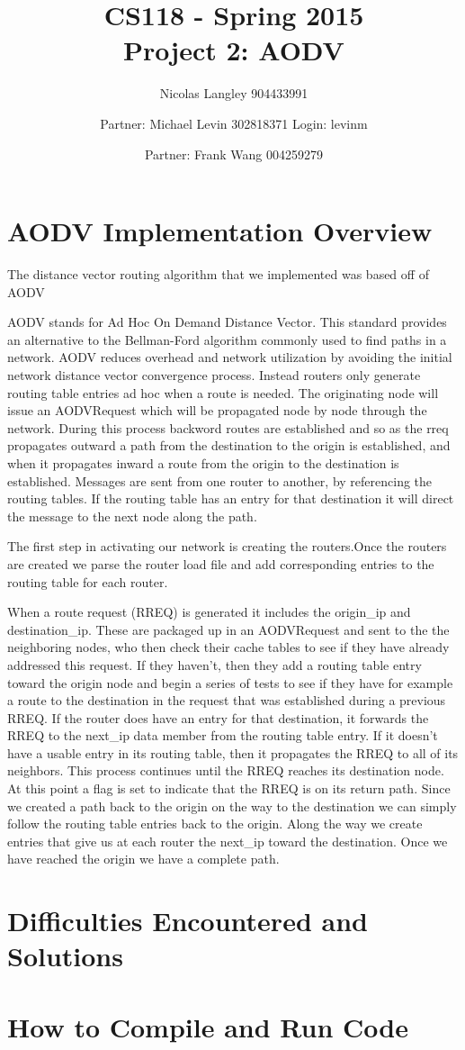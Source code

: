 \documentclass[12pt, titlepage]{article}
\begin{document}
\title{CS118 - Spring 2015 \\
Project 2: AODV}
\author{Nicolas Langley 904433991 \and Partner: Michael Levin 302818371 Login: levinm \and Partner: Frank Wang 004259279}

\maketitle
\section{AODV Implementation Overview}

The distance vector routing algorithm that we implemented was based off of AODV

AODV stands for Ad Hoc On Demand Distance Vector.
This standard provides an alternative to the Bellman-Ford algorithm commonly used to find paths in a network.
AODV reduces overhead and network utilization by avoiding the initial network distance vector convergence process.
Instead routers only generate routing table entries ad hoc when a route is needed.  The originating node will issue an AODVRequest which will be propagated node by node through the network. During this process backword routes are established and so as the rreq propagates outward a path from the destination to the origin is established, and when it propagates inward a route from the origin to the destination is established.  Messages are sent from one router to another, by referencing the routing tables.  If the routing table has an entry for that destination it will direct the message to the next node along the path.

The first step in activating our network is creating the routers.Once the routers are created we parse the router load file and add corresponding entries to the routing table for each router.


When a route request (RREQ) is generated it includes the origin_ip and destination_ip.  These are packaged up in an AODVRequest and sent to the the neighboring nodes, who then check their cache tables to see if they have already addressed this request.  If they haven't, then they add a routing table entry toward the origin node and begin a series of tests to see if they have for example a route to the destination in the request that was established during a previous RREQ.  If the router does have an entry for that destination, it forwards the RREQ to the next_ip data member from the routing table entry.  If it doesn't have a usable entry in its routing table, then it propagates the RREQ to all of its neighbors.  This process continues until the RREQ reaches its destination node.  At this point a flag is set to indicate that the RREQ is on its return path.  Since we created a path back to the origin on the way to the destination we can simply follow the routing table entries back to the origin.  Along the way we create entries that give us at each router the next_ip toward the destination.  Once we have reached the origin we have a complete path.



\section{Difficulties Encountered and Solutions}



\section{How to Compile and Run Code}
\end{document}
